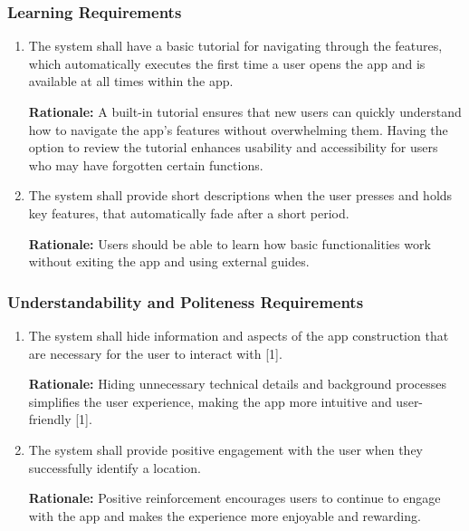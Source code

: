 \documentclass[]{article}
\begin{document}
\subsubsection{Learning Requirements}
\label{ssub:learning_requirements}
\begin{enumerate}[{UH-L}1. ]
	\item The system shall have a basic tutorial for navigating through the features, which automatically executes the first time a user opens the app and is available at all times within the app.
		
	{\bf Rationale:} A built-in tutorial ensures that new users can quickly understand how to navigate the app’s features without overwhelming them. Having the option to review the tutorial enhances usability and accessibility for users who may have forgotten certain functions.
	\item The system shall provide short descriptions when the user presses and holds key features, that automatically fade after a short period.
	
	{\bf Rationale:} Users should be able to learn how basic functionalities work without exiting the app and using external guides.
\end{enumerate}

\subsubsection{Understandability and Politeness Requirements}
\label{ssub:understandability_and_politeness_requirements}
\begin{enumerate}[{UH-UP}1. ]
	\item The system shall hide information and aspects of the app construction that are necessary for the user to interact with [1].
		
	{\bf Rationale:} Hiding unnecessary technical details and background processes simplifies the user experience, making the app more intuitive and user-friendly [1].
	\item The system shall provide positive engagement with the user when they successfully identify a location.
	
	{\bf Rationale:} Positive reinforcement encourages users to continue to engage with the app and makes the experience more enjoyable and rewarding.
\end{enumerate}
\end{document}
